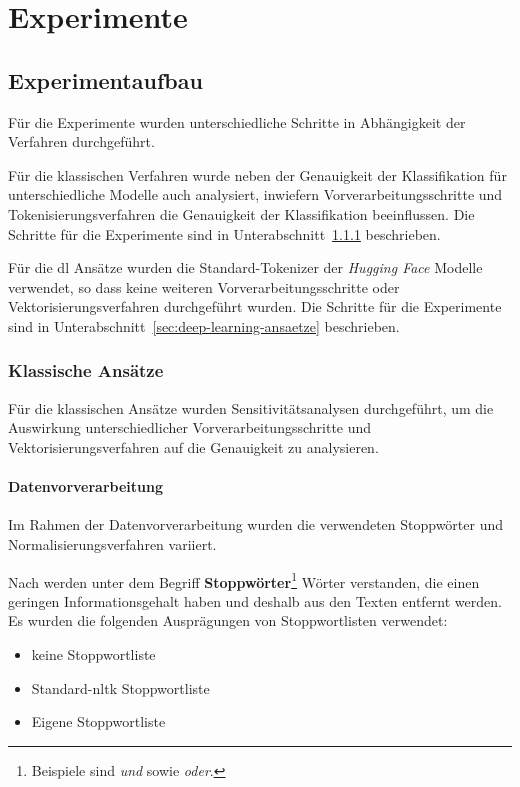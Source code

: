 \section{Experimente}

\subsection{Experimentaufbau}

Für die Experimente wurden unterschiedliche Schritte in Abhängigkeit der Verfahren durchgeführt.

Für die klassischen Verfahren wurde neben der Genauigkeit der Klassifikation für unterschiedliche Modelle auch analysiert, inwiefern Vorverarbeitungsschritte und Token\-isier\-ungs\-verfahren die Genauigkeit der Klassifikation beeinflussen.
Die Schritte für die Experimente sind in Unterabschnitt~\ref{sec:klassische-ansaetze} beschrieben.

Für die \gls{dl} Ansätze wurden die Standard-Tokenizer der \textit{Hugging Face} Modelle verwendet, so dass keine weiteren Vorverarbeitungsschritte oder Vektorisierungsverfahren durchgeführt wurden.
Die Schritte für die Experimente sind in Unterabschnitt~\ref{sec:deep-learning-ansaetze} beschrieben.

\subsubsection{Klassische Ansätze}\label{sec:klassische-ansaetze}

Für die klassischen Ansätze wurden Sensitivitätsanalysen durchgeführt, um die Auswirkung unterschiedlicher Vorverarbeitungsschritte und Vektorisierungsverfahren auf die Genauigkeit zu analysieren.


\paragraph{Datenvorverarbeitung}
Im Rahmen der Datenvorverarbeitung wurden die verwendeten Stoppwörter und Normalisierungsverfahren variiert.

Nach \cite[S.27]{manning2009introduction} werden unter dem Begriff \textbf{Stoppwörter}\footnote{Beispiele sind \textit{und} sowie \textit{oder}.} Wörter verstanden, die einen geringen Informationsgehalt haben und deshalb aus den Texten entfernt werden.
Es wurden die folgenden Ausprägungen von Stoppwortlisten verwendet:
\begin{itemize}
    \item keine Stoppwortliste
    \item Standard-\gls{nltk} Stoppwortliste
    \item Eigene Stoppwortliste
\end{itemize}


